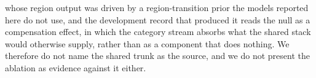 whose region output was driven by a region-transition prior the models reported here do not
use,
and the development record that produced it reads the null as a compensation effect, in
which the category stream absorbs what the shared stack would otherwise supply, rather
than as a component that does nothing. We therefore do not name the shared trunk as the
source, and we do not present the ablation as evidence against it either.

